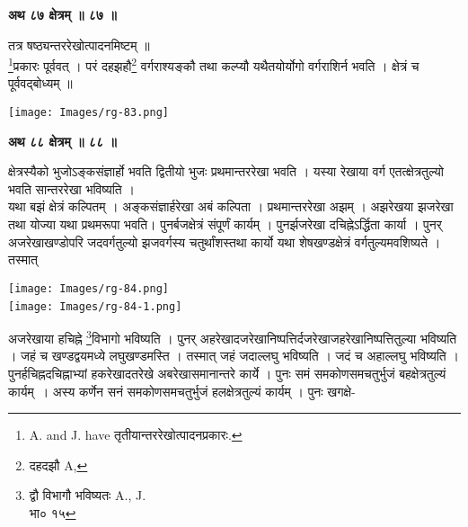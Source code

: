 \documentclass[11pt, openany]{book}
\begin{document}
\newpage
\begin{center}
\textbf{\large अथ ८७ क्षेत्रम् ॥ ८७ ॥}
\end{center}

{\ab तत्र षष्ठ्यन्तररेखोत्पादनमिष्टम् ॥ }\\

\renewcommand{\thefootnote}{१}\footnote{{\en A. and J. have} तृतीयान्तररेखोत्पादनप्रकारः.}प्रकारः पूर्ववत् । परं दहझहौ\renewcommand{\thefootnote}{२}\footnote{दहदझौ {\en A,}} वर्गराश्यङ्कौ तथा कल्प्यौ यथैतयोर्योगो वर्गराशिर्न भवति । क्षेत्रं च पूर्ववद्बोध्यम् ॥\\ 
\begin{center}
\texttt{[image: Images/rg-83.png]}
\end{center}

\begin{center}
\textbf{\large अथ ८८ क्षेत्रम् ॥ ८८ ॥}
\end{center}
\vspace{1mm}

{\ab क्षेत्रस्यैको भुजोऽङ्कसंज्ञार्हो भवति द्वितीयो भुजः प्रथमान्तररेखा भवति । यस्या रेखाया वर्ग एतत्क्षेत्रतुल्यो भवति सान्तररेखा भविष्यति । }\\

 यथा बझं क्षेत्रं कल्पितम् । अङ्कसंज्ञार्हरेखा अबं कल्पिता ।
प्रथमान्तररेखा अझम् । अझरेखया झजरेखा तथा योज्या यथा प्रथमरूपा भवति।
पुनर्बजक्षेत्रं संपूर्णं कार्यम् । पुनर्झजरेखा दचिह्नेऽर्द्धिता कार्या ।
पुनर् अजरेखाखण्डोपरि जदवर्गतुल्यो झजवर्गस्य चतुर्थांशस्तथा
कार्यो यथा शेषखण्डक्षेत्रं वर्गतुल्यमवशिष्यते ।
तस्मात् \\
\begin{vwcol}[widths={0.5,0.5}, sep=.8cm, rule=0pt]
\hspace{0.5in}\texttt{[image: Images/rg-84.png]}\\
 \texttt{[image: Images/rg-84-1.png]}\
\end{vwcol}
\vspace{5mm}

\noindent अजरेखाया हचिह्ने \renewcommand{\thefootnote}{३}\footnote{द्वौ विभागौ भविष्यतः {\en A., J.}\\
भा० १५
}विभागो भविष्यति । पुनर् अहरेखादजरेखानिष्पत्तिर्दजरेखाजहरेखानिष्पत्तितुल्या भविष्यति । जहं च
खण्डद्वयमध्ये लघुखण्डमस्ति । तस्मात् जहं
जदाल्लघु भविष्यति । जदं च अहाल्लघु
भविष्यति । पुनर्हचिह्नदचिह्नाभ्यां हकरेखादतरेखे अबरेखासमानान्तरे कार्ये । पुनः
समं समकोणसमचतुर्भुजं बहक्षेत्रतुल्यं कार्यम्~। अस्य कर्णेन सनं समकोणसमचतुर्भुजं हलक्षेत्रतुल्यं कार्यम् । पुनः खगक्षे-\\
\end{document}
